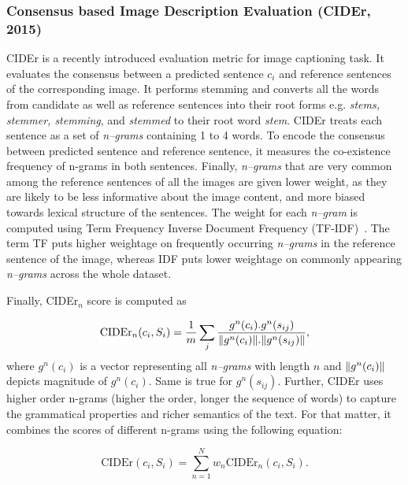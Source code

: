 \documentclass[10pt,journal,compsoc]{IEEEtran}
\DeclarePairedDelimiter{\norm}{\lVert}{\rVert}
\begin{document}
\subsubsection{Consensus based Image Description Evaluation (CIDEr, 2015)}
CIDEr \cite{vedantam2015cider} is a recently introduced evaluation metric for image
captioning task. It evaluates the consensus between a predicted sentence $c_i$ and reference sentences of the corresponding image. It performs stemming and converts all the words from candidate as well as reference sentences into their root forms e.g. \textit{stems, stemmer, stemming}, and \textit{stemmed} to their root word \textit{stem}. CIDEr treats each sentence as a set of \textit{n--grams} containing 1 to 4 words. To encode the consensus between predicted sentence and reference sentence, it measures the co-existence frequency of n-grams in both sentences. Finally, \textit{n--grams} that are very common among the reference sentences of all the images are given lower weight, as they are likely to be less informative about the image content, and more biased towards lexical structure of the sentences. The weight for each \textit{n--gram} is computed using Term Frequency Inverse Document Frequency (TF-IDF)~\cite{robertson2004understanding}. The term TF puts higher weightage on frequently occurring \textit{n--grams} in the reference sentence of the image, whereas IDF puts lower weightage on commonly appearing \textit{n--grams} across the whole dataset.

Finally, CIDEr$_n$ score is computed as 

$$\text{CIDEr}_n(c_i, S_i) = \frac{1}{m}\sum_{j}^{}\frac{g^{n}(c_i).g^{n}(s_{ij})}{\norm{g^{n}(c_i)}.\norm{g^{n}(s_{ij})}},$$
where $g^{n}(c_i)$ is a vector representing all \textit{n--grams} with length $n$ and $\norm{g^{n}(c_i)}$  depicts magnitude of $g^{n}(c_i)$. Same is true for $g^{n}(s_{ij})$. Further, CIDEr uses higher order n-grams (higher the order, longer the sequence of words) to capture the grammatical properties and richer semantics of the text. For that matter, it combines the scores of different n-grams using the following equation:

$$\text{CIDEr}(c_i, S_i) = \sum_{n=1}^{N}w_n \text{CIDEr}_n(c_i, S_i).$$
\end{document}
